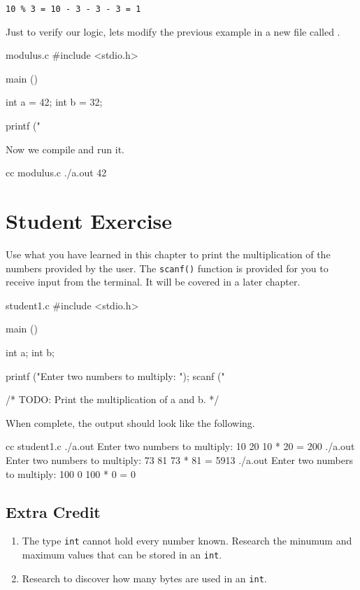 \begin{center}
\verb|10 % 3 = 10 - 3 - 3 - 3 = 1|
\end{center}

Just to verify our logic, lets modify the previous example in a new file
called .

\begin{code}{modulus.c}
#include <stdio.h>

main ()
{
    int a = 42;
    int b = 32;

    printf ("%
}
\end{code}

Now we compile  and run it.

\begin{Terminal}
cc modulus.c
./a.out
42 %
\end{Terminal}

\section{Student Exercise}

Use what you have learned in this chapter to print the multiplication of
the numbers provided by the user. The \verb|scanf()| function is provided for
you to receive input from the terminal. It will be covered in a later chapter.

\begin{code}{student1.c}
#include <stdio.h>

main ()
{
    int a;
    int b;

    printf ("Enter two numbers to multiply:  ");
    scanf ("%

    /* TODO: Print the multiplication of a and b. */
}
\end{code}

When complete, the output should look like the following.

\begin{Terminal}
cc student1.c
./a.out
Enter two numbers to multiply:  10 20
10 * 20 = 200
./a.out
Enter two numbers to multiply:  73 81
73 * 81 = 5913
./a.out
Enter two numbers to multiply:  100 0
100 * 0 = 0
\end{Terminal}


\subsection{Extra Credit}

\begin{enumerate}
\item The type \verb|int| cannot hold every number known. Research the minumum
and maximum values that can be stored in an \verb|int|.
\item Research to discover how many bytes are used in an \verb|int|.
\end{enumerate}
